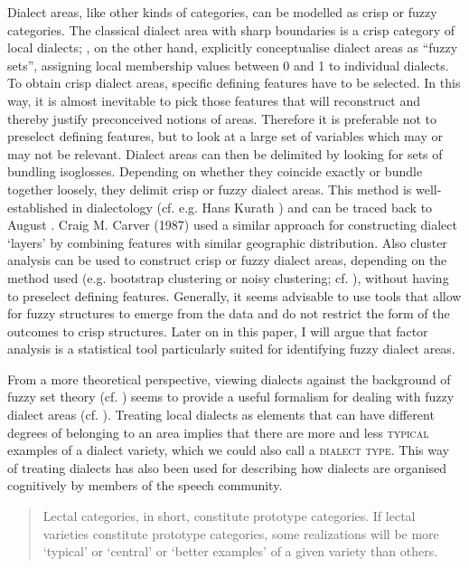 \documentclass[output=paper]{LSP/langsci}
\begin{document}
Dialect areas, like other kinds of categories, can be modelled as crisp or fuzzy categories. The classical dialect area with sharp boundaries is a crisp category of local dialects; \citet[108--113]{preston_applications_1993}, on the other hand, explicitly conceptualise dialect areas as “fuzzy sets”, assigning local membership values between 0 and 1 to individual dialects. To obtain crisp dialect areas, specific defining features have to be selected. In this way, it is almost inevitable to pick those features that will reconstruct and thereby justify preconceived notions of areas. Therefore it is preferable not to preselect defining features, but to look at a large set of variables which may or may not be relevant. Dialect areas can then be delimited by looking for sets of bundling isoglosses. Depending on whether they coincide exactly or bundle together loosely, they delimit crisp or fuzzy dialect areas. This method is well-established in dialectology (cf. e.g. Hans Kurath \citeyear{kurath_studies_1972}) and can be traced back to August \citet{bielenstein_grenzen_1892}. Craig M. Carver (1987) %
used a similar approach for constructing dialect ‘layers’ by combining features with similar geographic distribution. Also cluster analysis can be used to construct crisp or fuzzy dialect areas, depending on the method used (e.g. bootstrap clustering or noisy clustering; cf. \citealt[83]{nerbonne_gabmap_2011}), without having to preselect defining features. Generally, it seems advisable to use tools that allow for fuzzy structures to emerge from the data and do not restrict the form of the outcomes to crisp structures. Later on in this paper, I will argue that factor analysis is a statistical tool particularly suited for identifying fuzzy dialect areas.

From a more theoretical perspective, viewing dialects against the background of fuzzy set theory (cf. \citealt{zadeh_fuzzy_1965}) seems to provide a useful formalism for dealing with fuzzy dialect areas (cf. \citealt{preston_applications_1993}). Treating local dialects as elements that can have different degrees of belonging to an area implies that there are more and less \textsc{typical} examples of a dialect variety, which we could also call a \textsc{dialect type}. This way of treating dialects has also been used for describing how dialects are organised cognitively by members of the speech community.

\begin{quote}
Lectal categories, in short, constitute prototype categories. If lectal varieties constitute prototype categories, some realizations will be more ‘typical’ or ‘central’ or ‘better examples’ of a given variety than others. \citep[59]{kristiansen_style-shifting_2008}
\end{quote}
\end{document}
